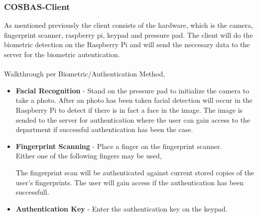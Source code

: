 \subsubsection{COSBAS-Client}
As mentioned previously the client consists of the hardware, which is the camera, fingerprint scanner, raspberry pi, keypad and pressure pad. The client will do the biometric detection on the Raspberry Pi and will send the neccesary data to the server for the biometric autentication.\\
\\
Walkthrough per Biometric/Authentication Method,
\begin{itemize}
		\item{\textbf{Facial Recognition } - Stand on the pressure pad to initialize the camera to take a photo. After an photo has been taken facial detection will occur in the Raspberry Pi to detect if there is in fact a face in the image. The image is sended to the server for authentication where the user can gain access to the department if successful authentication has been the case.} 
		\item{\textbf{Fingerprint Scanning} - Place a finger on the fingerprint scanner. \\
			Either one of the following fingers may be used, 

			The fingerprint scan will be authenticated against current stored copies of the user's fingerprints. The user will gain access if the authentication has been successfull.
			}

	\item{\textbf{Authentication Key} - Enter the authentication key on the keypad. 


		}
	\end{itemize}

